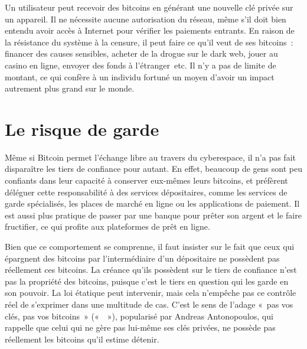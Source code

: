 Un utilisateur peut recevoir des bitcoins en générant une nouvelle clé privée sur un appareil. Il ne nécessite aucune autorisation du réseau, même s'il doit bien entendu avoir accès à Internet pour vérifier les paiements entrants. En raison de la résistance du système à la censure, il peut faire ce qu'il veut de ses bitcoins~: financer des causes sensibles, acheter de la drogue sur le dark web, jouer au casino en ligne, envoyer des fonds à l'étranger~etc. Il n'y a pas de limite de montant, ce qui confère à un individu fortuné un moyen d'avoir un impact autrement plus grand sur le monde.

\section*{Le risque de garde}

Même si Bitcoin permet l'échange libre au travers du cyberespace, il n'a pas fait disparaître les tiers de confiance pour autant. En effet, beaucoup de gens sont peu confiants dans leur capacité à conserver eux-mêmes leurs bitcoins, et préfèrent déléguer cette responsabilité à des services dépositaires, comme les services de garde spécialisés, les places de marché en ligne ou les applications de paiement. Il est aussi plus pratique de passer par une banque pour prêter son argent et le faire fructifier, ce qui profite aux plateformes de prêt en ligne.

Bien que ce comportement se comprenne, il faut insister sur le fait que ceux qui épargnent des bitcoins par l'intermédiaire d'un dépositaire ne possèdent pas réellement ces bitcoins. La créance qu'ils possèdent sur le tiers de confiance n'est pas la propriété des bitcoins, puisque c'est le tiers en question qui les garde en son pouvoir. La loi étatique peut intervenir, mais cela n'empêche pas ce contrôle réel de s'exprimer dans une multitude de cas. C'est le sens de l'adage «~pas vos clés, pas vos bitcoins~» («~~»), popularisé par Andreas Antonopoulos, qui rappelle que celui qui ne gère pas lui-même ses clés privées, ne possède pas réellement les bitcoins qu'il estime détenir. %

